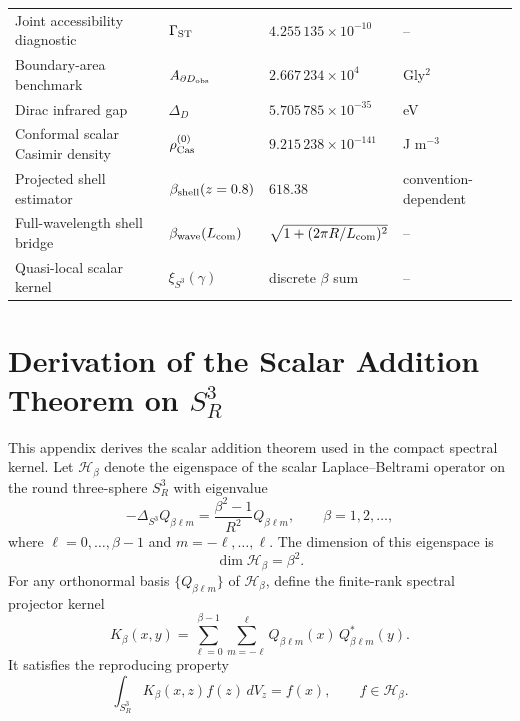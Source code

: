 \documentclass[aps,prd,onecolumn,superscriptaddress,longbibliography,nofootinbib,notitlepage]{revtex4-2}
\begin{document}
\begin{center}
{\begin{tabular}{llll}
Joint accessibility diagnostic & $\Gamma_{\rm ST}$ & $4.255\,135\times10^{-10}$ & -- \\
Boundary-area benchmark & $A_{\partial D_{\rm obs}}$ & $2.667\,234\times10^{4}$ & Gly$^2$ \\
Dirac infrared gap & $\Delta_D$ & $5.705\,785\times10^{-35}$ & eV \\
Conformal scalar Casimir density & $\rho_{\rm Cas}^{(0)}$ & $9.215\,238\times10^{-141}$ & J m$^{-3}$ \\
Projected shell estimator & $\beta_{\rm shell}(z=0.8)$ & $618.38$ & convention-dependent \\
Full-wavelength shell bridge & $\beta_{\rm wave}(L_{\rm com})$ & $\sqrt{1+(2\pi R/L_{\rm com})^2}$ & -- \\
Quasi-local scalar kernel & $\xi_{S^3}(\gamma)$ & discrete $\beta$ sum & -- \\
\bottomrule
\end{tabular}%
}
\end{center}



\clearpage

\appendix
\section{Derivation of the Scalar Addition Theorem on \texorpdfstring{$S^3_R$}{S3R}}
\label{app:addition-theorem}

This appendix derives the scalar addition theorem used in the compact spectral
kernel. Let $\mathcal H_\beta$ denote the eigenspace of the scalar
Laplace--Beltrami operator on the round three-sphere $S^3_R$ with eigenvalue
\begin{equation}
  -\Delta_{S^3}Q_{\beta\ell m}
  =
  \frac{\beta^2-1}{R^2}Q_{\beta\ell m},
  \qquad
  \beta=1,2,\ldots,
\end{equation}
where $\ell=0,\ldots,\beta-1$ and $m=-\ell,\ldots,\ell$. The dimension of this
eigenspace is
\begin{equation}
  \dim\mathcal H_\beta=\beta^2 .
\end{equation}
For any orthonormal basis $\{Q_{\beta\ell m}\}$ of $\mathcal H_\beta$, define the
finite-rank spectral projector kernel
\begin{equation}
  K_\beta(x,y)
  =
  \sum_{\ell=0}^{\beta-1}
  \sum_{m=-\ell}^{\ell}
  Q_{\beta\ell m}(x)\,
  Q^*_{\beta\ell m}(y).
\end{equation}
It satisfies the reproducing property
\begin{equation}
  \int_{S^3_R}K_\beta(x,z)f(z)\,dV_z=f(x),
  \qquad f\in\mathcal H_\beta.
\end{equation}
\end{document}
